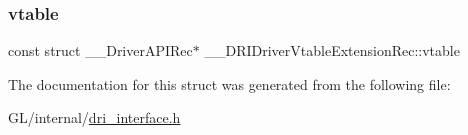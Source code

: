 \subsubsection{\texorpdfstring{vtable}{vtable}}
{\footnotesize\ttfamily const struct \+\_\+\+\_\+\+Driver\+A\+P\+I\+Rec$\ast$ \+\_\+\+\_\+\+D\+R\+I\+Driver\+Vtable\+Extension\+Rec\+::vtable}



The documentation for this struct was generated from the following file\+:\begin{DoxyCompactItemize}
\item 
G\+L/internal/\hyperlink{dri__interface_8h}{dri\+\_\+interface.\+h}\end{DoxyCompactItemize}
